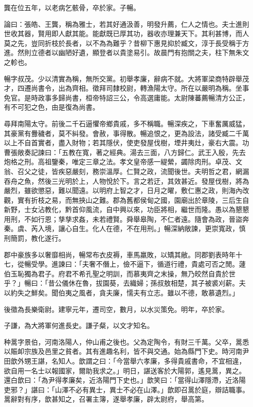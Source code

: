 \begin{pinyinscope}
龔在位五年，以老病乞骸骨，卒於家。子暢。

論曰：張皓、王龔，稱為雅士，若其好通汲善，明發升薦，仁人之情也。夫士進則世收其器，賢用即人獻其能。能獻既已厚其功，器收亦理兼天下。其利甚博，而人莫之先，豈同折枝於長者，以不為為難乎？昔柳下惠見抑於臧文，淳于長受稱于方進。然則立德者以幽陋好遺，顯登者以貴塗易引。故晨門有抱關之夫，柱下無朱文之軫也。

暢字叔茂。少以清實為稱，無所交黨。初舉孝廉，辭病不就。大將軍梁商特辟舉茂才，四遷尚書令，出為齊相。徵拜司隸校尉，轉漁陽太守。所在以嚴明為稱。坐事免官。是時政事多歸尚書，桓帝特詔三公，令高選庸能。太尉陳蕃薦暢清方公正，有不可犯之色，由是復為尚書。

尋拜南陽太守。前後二千石逼懼帝鄉貴戚，多不稱職。暢深疾之，下車奮厲威猛，其豪黨有釁穢者，莫不糾發。會赦，事得散。暢追恨之，更為設法，諸受臧二千萬以上不自首實者，盡入財物；若其隱伏，使吏發屋伐樹，堙井夷灶，豪右大震。功曹張敞奏記諫曰：「五教在寬，著之經典。湯去三面，八方歸仁。武王入殷，先去炮格之刑。高祖鑒秦，唯定三章之法。孝文皇帝感一緹縈，蠲除肉刑。卓茂、文翁、召父之徒，皆疾惡嚴刻，務崇溫厚。仁賢之政，流聞後世。夫明哲之君，網漏吞舟之魚，然後三光明於上，人物悅於下。言之若迂，其效甚近。發屋伐樹，將為嚴烈，雖欲懲惡，難以聞遠。以明府上智之才，日月之曜，敷仁惠之政，則海內改觀，實有折枝之易，而無挾山之難。郡為舊都侯甸之國，園廟出於章陵，三后生自新野，士女沾教化，黔首仰風流，自中興以來，功臣將相，繼世而隆。愚以為懇懇用刑，不如行恩；孳孳求姦，未若禮賢。舜舉皋陶，不仁者遠。隨會為政，晉盜奔秦。虞、芮入境，讓心自生。化人在德，不在用刑。」暢深納敞諫，更崇寬政，慎刑簡罰，教化遂行。

郡中豪族多以奢靡相尚，暢常布衣皮褥，車馬羸敗，以矯其敝。同郡劉表時年十七，從暢受學。進諫曰：「夫奢不僭上，儉不逼下，循道行禮，貴處可否之閒。蘧伯玉恥獨為君子。府君不希孔聖之明訓，而慕夷齊之末操，無乃皎然自貴於世乎？」暢曰：「昔公儀休在魯，拔園葵，去織婦；孫叔敖相楚，其子被裘刈薪。夫以約失之鮮矣。聞伯夷之風者，貪夫廉，懦夫有立志。雖以不德，敢慕遺烈。」

後徵為長樂衛尉。建寧元年，遷司空，數月，以水災策免。明年，卒於家。

子謙，為大將軍何進長史。謙子粲，以文才知名。

种暠字景伯，河南洛陽人，仲山甫之後也。父為定陶令，有財三千萬。父卒，暠悉以賑卹宗族及邑里之貧者。其有進趣名利，皆不與交通。始為縣門下史。時河南尹田歆外甥王諶，名知人。歆謂之曰：「今當舉六孝廉，多得貴戚書命，不宜相違，欲自用一名士以報國家，爾助我求之。」明日，諶送客於大陽郭，遙見暠，異之。還白歆曰：「為尹得孝廉矣，近洛陽門下史也。」歆笑曰：「當得山澤隱滯，近洛陽吏邪？」諶曰：「山澤不必有異士，異士不必在山澤。」歆即召暠於庭，辯詰職事。暠辭對有序，歆甚知之，召署主簿，遂舉孝廉，辟太尉府，舉高第。


\end{pinyinscope}
